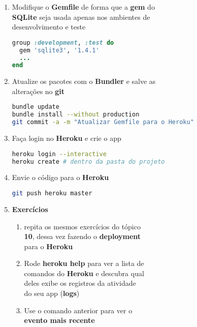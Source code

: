 \documentclass[a4paper,12pt]{article}
\begin{document}
\begin{enumerate}
  \item Modifique o \textbf{Gemfile} de forma que a \textbf{gem} do \\
        \textbf{SQLite} seja usada apenas nos ambientes de \\
        desenvolvimento e teste

    \begin{lstlisting}[language=Ruby, title=Gemfile]
group :development, :test do
  gem 'sqlite3', '1.4.1'
  ...
end
    \end{lstlisting}

  \item Atualize os pacotes com o \textbf{Bundler} e salve as \\
        alterações no \textbf{git}

    \begin{lstlisting}[language=Bash, commentstyle=\color{gray}]
bundle update
bundle install --without production
git commit -a -m "Atualizar Gemfile para o Heroku"
    \end{lstlisting}

  \item Faça login no \textbf{Heroku} e crie o app

    \begin{lstlisting}[language=Bash, commentstyle=\color{gray}]
heroku login --interactive
heroku create # dentro da pasta do projeto
    \end{lstlisting}

  \item Envie o código para o \textbf{Heroku}

    \begin{lstlisting}[language=Bash, commentstyle=\color{gray}]
git push heroku master
    \end{lstlisting}

  \item \textbf{Exercícios}

    \begin{enumerate}
      \item repita os mesmos exercícios do tópico \\
            \textbf{10}, dessa vez fazendo o \textbf{deployment} \\
            para o \textbf{Heroku}
      \item Rode \textbf{heroku help} para ver a lista de \\
            comandos do \textbf{Heroku} e descubra qual \\
            deles exibe os registros da atividade \\
            do seu app (\textbf{logs})
      \item Use o comando anterior para ver o \\
            \textbf{evento mais recente}
    \end{enumerate}
\end{enumerate}
\end{document}
